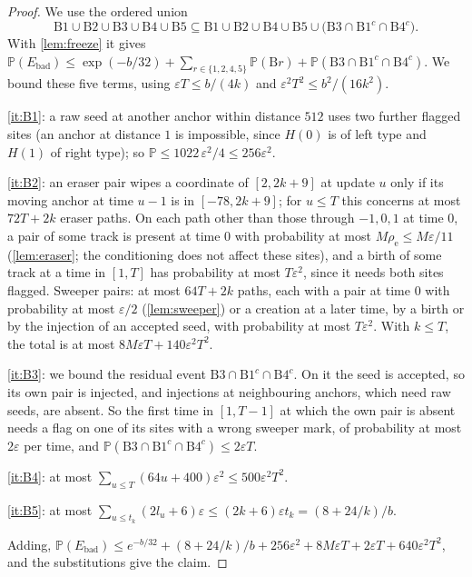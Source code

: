 \documentclass[11pt]{article}
\theoremstyle{plain}
\theoremstyle{definition}
\theoremstyle{remark}
\newcommand{\Prob}{\mathbb P}
\newcommand{\eps}{\varepsilon}
\begin{document}
\begin{proof}
We use the ordered union
\[
\mathrm B1\cup\mathrm B2\cup\mathrm B3\cup\mathrm B4\cup\mathrm B5\subseteq\mathrm B1\cup\mathrm B2\cup\mathrm B4\cup\mathrm B5\cup\bigl(\mathrm B3\cap\mathrm B1^{c}\cap\mathrm B4^{c}\bigr).
\]
With \cref{lem:freeze} it gives $\Prob(E_{\mathrm{bad}})\le\exp(-b/32)+\sum_{r\in\{1,2,4,5\}}\Prob(\mathrm{B}r)+\Prob(\mathrm B3\cap\mathrm B1^{c}\cap\mathrm B4^{c})$. We bound these five terms, using $\eps T\le b/(4k)$ and $\eps^2T^2\le b^2/(16k^2)$.

\ref{it:B1}: a raw seed at another anchor within distance $512$ uses two further flagged sites (an anchor at distance $1$ is impossible, since $H(0)$ is of left type and $H(1)$ of right type); so $\Prob\le1022\,\eps^2/4\le256\eps^2$.

\ref{it:B2}: an eraser pair wipes a coordinate of $[2,2k+9]$ at update $u$ only if its moving anchor at time $u-1$ is in $[-78,2k+9]$; for $u\le T$ this concerns at most $72T+2k$ eraser paths. On each path other than those through $-1,0,1$ at time $0$, a pair of some track is present at time $0$ with probability at most $M\rho_{\mathrm e}\le M\eps/11$ (\cref{lem:eraser}; the conditioning does not affect these sites), and a birth of some track at a time in $[1,T]$ has probability at most $T\eps^2$, since it needs both sites flagged. Sweeper pairs: at most $64T+2k$ paths, each with a pair at time $0$ with probability at most $\eps/2$ (\cref{lem:sweeper}) or a creation at a later time, by a birth or by the injection of an accepted seed, with probability at most $T\eps^2$. With $k\le T$, the total is at most $8M\eps T+140\eps^2T^2$.

\ref{it:B3}: we bound the residual event $\mathrm B3\cap\mathrm B1^{c}\cap\mathrm B4^{c}$. On it the seed is accepted, so its own pair is injected, and injections at neighbouring anchors, which need raw seeds, are absent. So the first time in $[1,T-1]$ at which the own pair is absent needs a flag on one of its sites with a wrong sweeper mark, of probability at most $2\eps$ per time, and $\Prob(\mathrm B3\cap\mathrm B1^{c}\cap\mathrm B4^{c})\le2\eps T$.

\ref{it:B4}: at most $\sum_{u\le T}(64u+400)\eps^2\le500\eps^2T^2$.

\ref{it:B5}: at most $\sum_{u\le t_k}(2l_u+6)\eps\le(2k+6)\eps t_k=(8+24/k)/b$.

Adding, $\Prob(E_{\mathrm{bad}})\le e^{-b/32}+(8+24/k)/b+256\eps^2+8M\eps T+2\eps T+640\eps^2T^2$, and the substitutions give the claim.
\end{proof}
\end{document}
